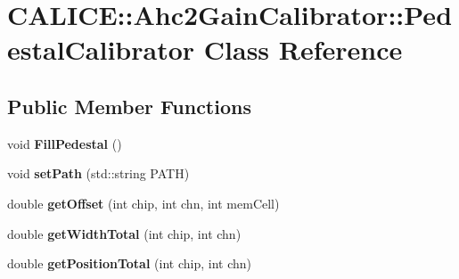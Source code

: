 \section{C\-A\-L\-I\-C\-E\-:\-:Ahc2\-Gain\-Calibrator\-:\-:Pedestal\-Calibrator Class Reference}
\label{classCALICE_1_1Ahc2GainCalibrator_1_1PedestalCalibrator}
\subsection*{Public Member Functions}
\begin{DoxyCompactItemize}
\item 
void {\bfseries Fill\-Pedestal} ()\label{classCALICE_1_1Ahc2GainCalibrator_1_1PedestalCalibrator_ac8495f26ef09163ccdc5e362c2d6821d}

\item 
void {\bfseries set\-Path} (std\-::string P\-A\-T\-H)\label{classCALICE_1_1Ahc2GainCalibrator_1_1PedestalCalibrator_a3d8ff605481b2ae0d82b6efffecede38}

\item 
double {\bfseries get\-Offset} (int chip, int chn, int mem\-Cell)\label{classCALICE_1_1Ahc2GainCalibrator_1_1PedestalCalibrator_a00171a69b81f4e2ac6ca24b73b4b9327}

\item 
double {\bfseries get\-Width\-Total} (int chip, int chn)\label{classCALICE_1_1Ahc2GainCalibrator_1_1PedestalCalibrator_a7164284c298c314cb3db32210a88cc8c}

\item 
double {\bfseries get\-Position\-Total} (int chip, int chn)\label{classCALICE_1_1Ahc2GainCalibrator_1_1PedestalCalibrator_a92d1724e50988de6acff8f92da87f188}

\end{DoxyCompactItemize}

